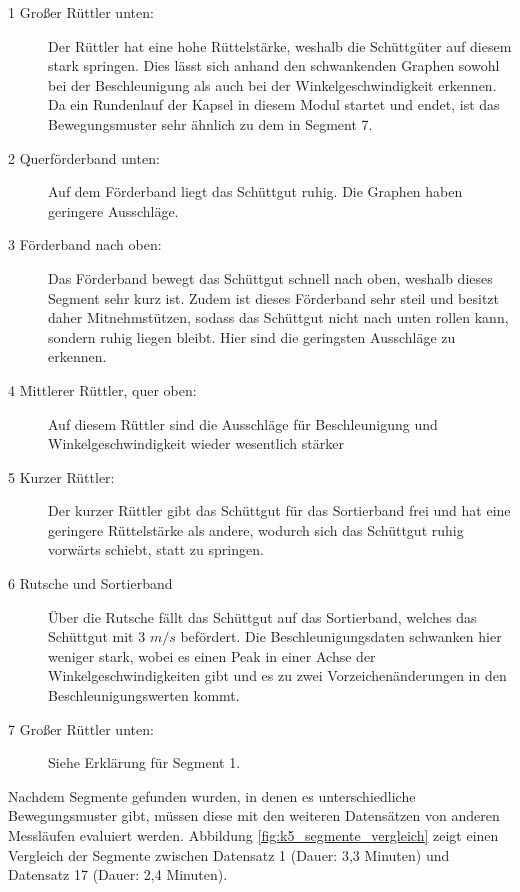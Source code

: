 \begin{description}
	\item [1 Großer Rüttler unten:] Der Rüttler hat eine hohe Rüttelstärke, weshalb die Schüttgüter auf diesem stark springen. Dies lässt sich anhand den schwankenden Graphen sowohl bei der Beschleunigung als auch bei der Winkelgeschwindigkeit erkennen. Da ein Rundenlauf der Kapsel in diesem Modul startet und endet, ist das Bewegungsmuster sehr ähnlich zu dem in Segment 7.
	\item [2 Querförderband unten:] Auf dem Förderband liegt das Schüttgut ruhig. Die Graphen haben geringere Ausschläge. 
	\item [3 Förderband nach oben:] Das Förderband bewegt das Schüttgut schnell nach oben, weshalb dieses Segment sehr kurz ist. Zudem ist dieses Förderband sehr steil und besitzt daher Mitnehmstützen, sodass das Schüttgut nicht nach unten rollen kann, sondern ruhig liegen bleibt. Hier sind die geringsten Ausschläge zu erkennen.
	\item [4 Mittlerer Rüttler, quer oben:] Auf diesem Rüttler sind die Ausschläge für Beschleunigung und Winkelgeschwindigkeit wieder wesentlich stärker
	\item [5 Kurzer Rüttler:] Der kurzer Rüttler gibt das Schüttgut für das Sortierband frei und hat eine geringere Rüttelstärke als andere, wodurch sich das Schüttgut ruhig vorwärts schiebt, statt zu springen.
	\item [6 Rutsche und Sortierband] Über die Rutsche fällt das Schüttgut auf das Sortierband, welches das Schüttgut mit 3 $m/s$ befördert. Die Beschleunigungsdaten schwanken hier weniger stark, wobei es einen Peak in einer Achse der Winkelgeschwindigkeiten gibt und es zu zwei Vorzeichenänderungen in den Beschleunigungswerten kommt.   
	\item [7 Großer Rüttler unten:] Siehe Erklärung für Segment 1.	
\end{description}

Nachdem Segmente gefunden wurden, in denen es unterschiedliche Bewegungsmuster gibt, müssen diese mit den weiteren Datensätzen von anderen Messläufen evaluiert werden. Abbildung \ref{fig:k5_segmente_vergleich} zeigt einen Vergleich der Segmente zwischen Datensatz 1 (Dauer: 3,3 Minuten) und Datensatz 17 (Dauer: 2,4 Minuten). 

